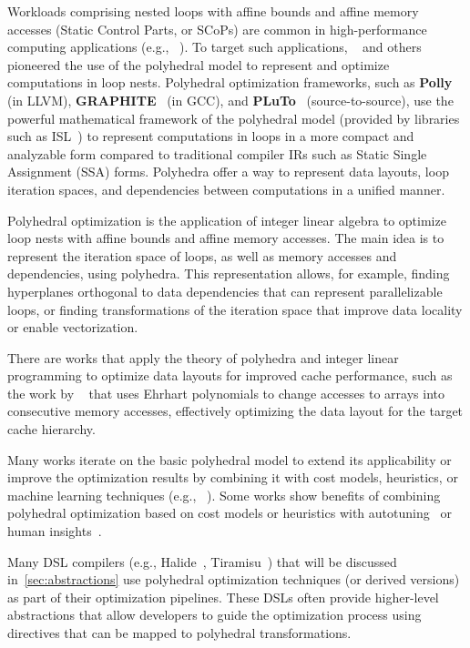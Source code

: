 Workloads comprising nested loops with affine bounds and affine memory accesses (Static Control Parts, or SCoPs) are common in high-performance computing applications (e.g., \citeauthor{bacon1994compiler}~\cite{bacon1994compiler}). To target such applications, \citeauthor{feautrier1992some}~\cite{feautrier1992some} and others pioneered the use of the polyhedral model to represent and optimize computations in loop nests. Polyhedral optimization frameworks, such as \textbf{Polly}~\cite{grosser2012polly} (in LLVM), \textbf{GRAPHITE}~\cite{trifunovic2010graphite} (in GCC), and \textbf{PLuTo}~\cite{bondhugula2008pluto} (source-to-source), use the powerful mathematical framework of the polyhedral model (provided by libraries such as ISL~\cite{verdoolaege2010isl}) to represent computations in loops in a more compact and analyzable form compared to traditional compiler IRs such as Static Single Assignment (SSA) forms. Polyhedra offer a way to represent data layouts, loop iteration spaces, and dependencies between computations in a unified manner.

Polyhedral optimization is the application of integer linear algebra to optimize loop nests with affine bounds and affine memory accesses. The main idea is to represent the iteration space of loops, as well as memory accesses and dependencies, using polyhedra. This representation allows, for example, finding hyperplanes orthogonal to data dependencies that can represent parallelizable loops, or finding transformations of the iteration space that improve data locality or enable vectorization.

There are works that apply the theory of polyhedra and integer linear programming to optimize data layouts for improved cache performance, such as the work by \citeauthor{clauss2000automatic}~\cite{clauss2000automatic} that uses Ehrhart polynomials to change accesses to arrays into consecutive memory accesses, effectively optimizing the data layout for the target cache hierarchy.

Many works iterate on the basic polyhedral model to extend its applicability or improve the optimization results by combining it with cost models, heuristics, or machine learning techniques (e.g., \citeauthor{baghdadi2021deep}~\cite{baghdadi2021deep}). Some works show benefits of combining polyhedral optimization based on cost models or heuristics with autotuning~\cite{chelini2020automatic} or human insights~\cite{zinenko2014clint,bagneres2016opening}.

Many DSL compilers (e.g., Halide~\cite{ragan2013halide}, Tiramisu~\cite{baghdadi2019tiramisu}) that will be discussed in~\cref{sec:abstractions} use polyhedral optimization techniques (or derived versions) as part of their optimization pipelines. These DSLs often provide higher-level abstractions that allow developers to guide the optimization process using directives that can be mapped to polyhedral transformations.

